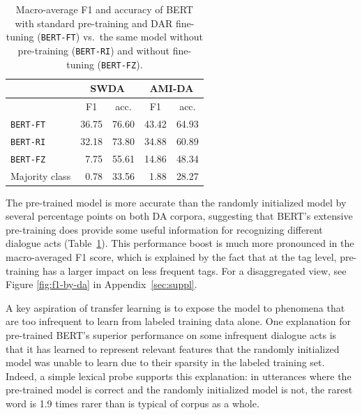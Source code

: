 \documentclass[11pt,a4paper]{article}
\begin{document}
\begin{table}[]
\centering
\begin{tabular}{@{}lrrrr@{}}
\toprule
                           & \multicolumn{2}{c}{SWDA}                          & \multicolumn{2}{c}{AMI-DA}                        \\ \midrule
                           & \multicolumn{1}{c}{F1} & \multicolumn{1}{c}{acc.} & \multicolumn{1}{c}{F1} & \multicolumn{1}{c}{acc.} \\
\texttt{BERT-FT} & 36.75           & 76.60                    & 43.42                  & 64.93                    \\
\texttt{BERT-RI} & 32.18           & 73.80                    & 34.88                  & 60.89                    \\
\texttt{BERT-FZ} & 7.75            & 55.61                    & 14.86                  & 48.34 \\ \midrule
    Majority class    & 0.78  & 33.56 &  1.88 & 28.27      \\ \bottomrule
\end{tabular}
  \caption{Macro-average F1 and accuracy of BERT with standard pre-training and DAR fine-tuning (\texttt{BERT-FT}) vs.~the same model without pre-training (\texttt{BERT-RI}) and without fine-tuning (\texttt{BERT-FZ}).}
  \label{table:exp2}
\end{table}

The pre-trained model is more accurate than the randomly initialized model by several percentage points on both DA corpora,
suggesting that BERT's extensive pre-training does provide some useful information for recognizing different dialogue acts (Table~\ref{table:exp2}).
This performance boost is much more pronounced in the macro-averaged F1 score,
which is explained by the fact that at the tag level, pre-training has a larger impact on less frequent tags.
For a disaggregated view, see Figure \ref{fig:f1-by-da} in Appendix~\ref{sec:suppl}.

A key aspiration of transfer learning is to expose the model to phenomena that are too infrequent to learn from labeled training data alone.
One explanation for pre-trained BERT's superior performance on some infrequent dialogue acts is that it has learned to represent relevant features
that the randomly initialized model was unable to learn due to their sparsity in the labeled training set.
Indeed, a simple lexical probe supports this explanation: in utterances where the pre-trained model is correct and the randomly initialized model is not,
the rarest word is 1.9 times rarer than is typical of corpus as a whole.
\end{document}
